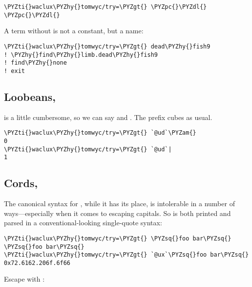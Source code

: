 \begin{framed_shaded}
\begin{Verbatim}[fontsize=\relsize{-2.5},fontseries=b,commandchars=\\\{\}]
\PYZti{}waclux\PYZhy{}tomwyc/try=\PYZgt{} \PYZpc{}\PYZdl{}
\PYZpc{}\PYZdl{}
\end{Verbatim}
\end{framed_shaded}
A term without \kode{\%} is not a constant, but a name:

\begin{framed_shaded}
\begin{Verbatim}[fontsize=\relsize{-2.5},fontseries=b,commandchars=\\\{\}]
\PYZti{}waclux\PYZhy{}tomwyc/try=\PYZgt{} dead\PYZhy{}fish9
! \PYZhy{}find\PYZhy{}limb.dead\PYZhy{}fish9
! find\PYZhy{}none
! exit
\end{Verbatim}
\end{framed_shaded}

\subsection{Loobeans, }

 is a little cumbersome, so we can say \kode{\&} and \kode{\textbar{}}.
The \kode{\%} prefix cubes as usual.

\begin{framed_shaded}
\begin{Verbatim}[fontsize=\relsize{-2.5},fontseries=b,commandchars=\\\{\}]
\PYZti{}waclux\PYZhy{}tomwyc/try=\PYZgt{} `@ud`\PYZam{}
0
\PYZti{}waclux\PYZhy{}tomwyc/try=\PYZgt{} `@ud`|
1
\end{Verbatim}
\end{framed_shaded}

\subsection{Cords, }

The canonical \kode{\sig \sig } syntax for , while it has its place, 
is intolerable in a number of ways---especially when it comes to
escaping capitals.  So  is both printed and parsed in a
conventional-looking single-quote syntax:

\begin{framed_shaded}
\begin{Verbatim}[fontsize=\relsize{-2.5},fontseries=b,commandchars=\\\{\}]
\PYZti{}waclux\PYZhy{}tomwyc/try=\PYZgt{} \PYZsq{}foo bar\PYZsq{}
\PYZsq{}foo bar\PYZsq{}
\PYZti{}waclux\PYZhy{}tomwyc/try=\PYZgt{} `@ux`\PYZsq{}foo bar\PYZsq{}
0x72.6162.206f.6f66
\end{Verbatim}
\end{framed_shaded}
Escape  with \kode{\textbackslash{}}:

